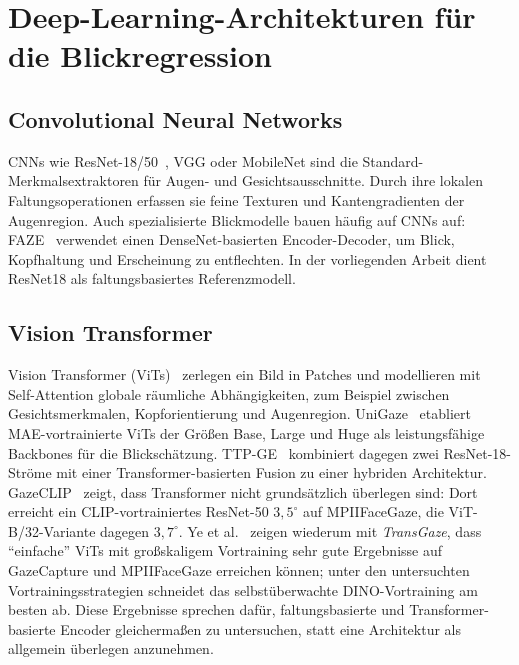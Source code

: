 \documentclass[
  11pt,
  a4paper,
  oneside,
  DIV=12,                 %
  BCOR=8mm,               %
  parskip=half,           %
  headings=normal,
  bibliography=totoc,     %
  listof=totoc            %
]{scrreprt}
\begin{document}
\section{Deep-Learning-Architekturen für die Blickregression}
\label{sec:architekturen}
\subsection{Convolutional Neural Networks}
\label{subsec:cnn}
CNNs wie ResNet-18/50~\cite{he2016resnet}, VGG oder MobileNet sind die Standard-Merkmalsextraktoren für Augen- und Gesichtsausschnitte. Durch ihre lokalen Faltungsoperationen erfassen sie feine Texturen und Kantengradienten der Augenregion. Auch spezialisierte Blickmodelle bauen häufig auf CNNs auf: FAZE~\cite{park2019faze} verwendet einen DenseNet-basierten Encoder-Decoder, um Blick, Kopfhaltung und Erscheinung zu entflechten. In der vorliegenden Arbeit dient ResNet18 als faltungsbasiertes Referenzmodell.

\subsection{Vision Transformer}
\label{subsec:vit}
Vision Transformer (ViTs)~\cite{dosovitskiy2021vit} zerlegen ein Bild in Patches und modellieren mit Self-Attention globale räumliche Abhängigkeiten, zum Beispiel zwischen Gesichtsmerkmalen, Kopforientierung und Augenregion. UniGaze~\cite{qin2026unigaze} etabliert MAE-vortrainierte ViTs der Größen Base, Large und Huge als leistungsfähige Backbones für die Blickschätzung. TTP-GE~\cite{nagpure2025ttpge} kombiniert dagegen zwei ResNet-18-Ströme mit einer Transformer-basierten Fusion zu einer hybriden Architektur. GazeCLIP~\cite{wang2026gazeclip} zeigt, dass Transformer nicht grundsätzlich überlegen sind: Dort erreicht ein CLIP-vortrainiertes ResNet-50 $3,5^\circ$ auf MPIIFaceGaze, die ViT-B/32-Variante dagegen $3,7^\circ$. Ye et al.~\cite{ye2024transgaze} zeigen wiederum mit \emph{TransGaze}, dass \enquote{einfache} ViTs mit großskaligem Vortraining sehr gute Ergebnisse auf GazeCapture und MPIIFaceGaze erreichen können; unter den untersuchten Vortrainingsstrategien schneidet das selbstüberwachte DINO-Vortraining am besten ab. Diese Ergebnisse sprechen dafür, faltungsbasierte und Transformer-basierte Encoder gleichermaßen zu untersuchen, statt eine Architektur als allgemein überlegen anzunehmen.
\end{document}

